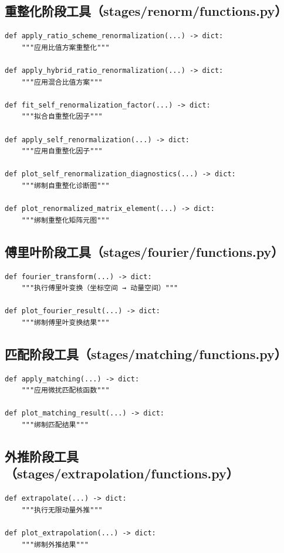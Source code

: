 \documentclass[12pt,a4paper]{ctexart}
\begin{document}
\subsection{重整化阶段工具（stages/renorm/functions.py）}

\begin{lstlisting}[style=pycode]
def apply_ratio_scheme_renormalization(...) -> dict:
    """应用比值方案重整化"""

def apply_hybrid_ratio_renormalization(...) -> dict:
    """应用混合比值方案"""

def fit_self_renormalization_factor(...) -> dict:
    """拟合自重整化因子"""

def apply_self_renormalization(...) -> dict:
    """应用自重整化因子"""

def plot_self_renormalization_diagnostics(...) -> dict:
    """绑制自重整化诊断图"""

def plot_renormalized_matrix_element(...) -> dict:
    """绑制重整化矩阵元图"""
\end{lstlisting}

\subsection{傅里叶阶段工具（stages/fourier/functions.py）}

\begin{lstlisting}[style=pycode]
def fourier_transform(...) -> dict:
    """执行傅里叶变换（坐标空间 → 动量空间）"""

def plot_fourier_result(...) -> dict:
    """绑制傅里叶变换结果"""
\end{lstlisting}

\subsection{匹配阶段工具（stages/matching/functions.py）}

\begin{lstlisting}[style=pycode]
def apply_matching(...) -> dict:
    """应用微扰匹配核函数"""

def plot_matching_result(...) -> dict:
    """绑制匹配结果"""
\end{lstlisting}

\subsection{外推阶段工具（stages/extrapolation/functions.py）}

\begin{lstlisting}[style=pycode]
def extrapolate(...) -> dict:
    """执行无限动量外推"""

def plot_extrapolation(...) -> dict:
    """绑制外推结果"""
\end{lstlisting}
\end{document}
